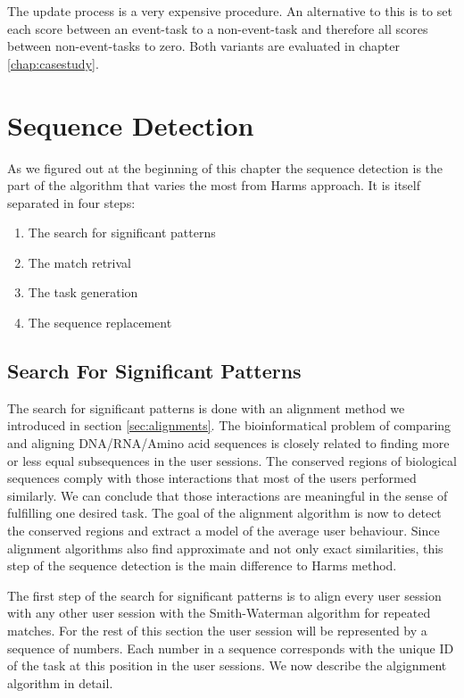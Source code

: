 The update process is a very expensive procedure. An alternative to this is to set each score between an event-task to a non-event-task and therefore all scores between non-event-tasks to zero.
Both variants are evaluated in chapter \ref{chap:casestudy}.
\section{Sequence Detection}
As we figured out at the beginning of this chapter the sequence detection is the part of the algorithm that varies the most from Harms approach.
It is itself separated in four steps:
\begin{enumerate}
	\item The search for significant patterns
	\item The match retrival
	\item The task generation
	\item The sequence replacement
\end{enumerate}

\subsection{Search For Significant Patterns}
The search for significant patterns is done with an alignment method we introduced in section \ref{sec:alignments}.
The bioinformatical problem of comparing and aligning DNA/RNA/Amino acid sequences is closely related to finding more or less equal subsequences in the user sessions.
The conserved regions of biological sequences comply with those interactions that most of the users performed similarly.
We can conclude that those interactions are meaningful in the sense of fulfilling one desired task.
The goal of the alignment algorithm is now to detect the conserved regions and extract a model of the average user behaviour.
Since alignment algorithms also find approximate and not only exact similarities, this step of the sequence detection is the main difference to Harms method.

The first step of the search for significant patterns is to align every user session with any other user session with the Smith-Waterman algorithm for repeated matches.
For the rest of this section the user session will be represented by a sequence of numbers. Each number in a sequence corresponds with the unique ID of the task at this position in the user sessions.
We now describe the algignment algorithm in detail.

